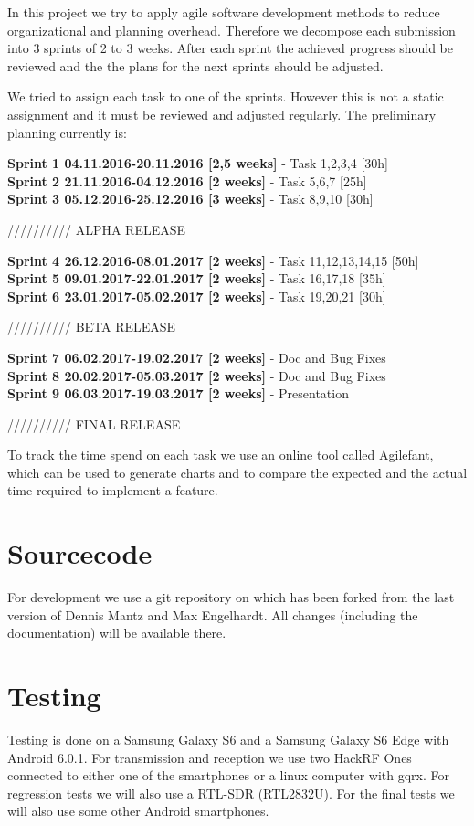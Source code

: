 In this project we try to apply agile software development methods to reduce organizational and planning overhead. Therefore we decompose each submission into 3 sprints of 2 to 3 weeks. After each sprint the achieved progress should be reviewed and the the plans for the next sprints should be adjusted. 

We tried to assign each task to one of the sprints. However this is not a static assignment and it must be reviewed and adjusted regularly. The preliminary planning currently is: 


\noindent\textbf{Sprint 1 04.11.2016-20.11.2016 [2,5 weeks]} 
- Task 1,2,3,4 [30h]\\
\textbf{Sprint 2 21.11.2016-04.12.2016 [2 weeks]}
- Task 5,6,7 [25h]\\
\textbf{Sprint 3 05.12.2016-25.12.2016 [3 weeks]}
- Task 8,9,10 [30h]

////////// ALPHA RELEASE

\noindent\textbf{Sprint 4 26.12.2016-08.01.2017 [2 weeks]}
- Task 11,12,13,14,15 [50h]\\
\textbf{Sprint 5 09.01.2017-22.01.2017 [2 weeks]}
- Task 16,17,18 [35h]\\
\textbf{Sprint 6 23.01.2017-05.02.2017 [2 weeks]}
- Task 19,20,21 [30h]


////////// BETA RELEASE

\noindent\textbf{Sprint 7 06.02.2017-19.02.2017 [2 weeks]}
- Doc and Bug Fixes\\
\textbf{Sprint 8 20.02.2017-05.03.2017 [2 weeks]}
- Doc and Bug Fixes\\
\textbf{Sprint 9 06.03.2017-19.03.2017 [2 weeks]}
- Presentation 

////////// FINAL RELEASE

To track the time spend on each task we use an online tool called Agilefant, which can be used to generate charts and to compare the expected and the actual time required to implement a feature. 

\section{Sourcecode}

For development we use a git repository on \cite{ANSIAN_GitHub} which has been forked from the last version of Dennis Mantz and Max Engelhardt. All changes (including the documentation) will be available there.

\section{Testing}

Testing is done on a Samsung Galaxy S6 and a Samsung Galaxy S6 Edge with Android 6.0.1. For transmission and reception we use two HackRF Ones connected to either one of the smartphones or a linux computer with gqrx. For regression tests we will also use a RTL-SDR (RTL2832U). For the final tests we will also use some other Android smartphones. 